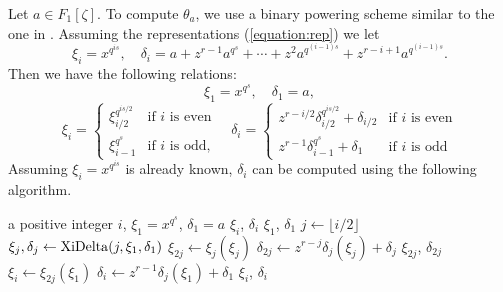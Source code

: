 \documentclass[12pt]{article}
\theoremstyle{plain}
\theoremstyle{definition}
\newcounter{algorithm}
\begin{document}
Let $a \in F_1[\zeta]$. To compute $\theta_a$, we use a binary powering scheme similar to the one 
in \cite{doliskanischost2011}. Assuming the representations (\ref{equation:rep}) we let 
\[
\xi_i = x^{q^{is}}, \quad
\delta_i = a + z^{r - 1}a^{q^s} + \cdots + z^2a^{q^{(i - 1)s}} + z^{r - i + 1} a^{q^{(i - 1)s}}.
\]
Then we have the following relations:
\[\xi_1 = x^{q^s}, \quad \delta_1 = a, \]
\[
\xi_i =
\begin{cases}
\xi_{i / 2}^{q^{is / 2}} & \text{if $i$ is even}  \\
\xi_{i - 1}^{q^s} & \text{if $i$ is odd,}
\end{cases} \quad
\delta_i=
\begin{cases}
z^{r - i / 2}\delta_{i / 2}^{q^{is / 2}} + \delta_{i / 2} & \text{if $i$ is even} \\
z^{r - 1}\delta_{i - 1}^{q^s} + \delta_1 & \text{if $i$ is odd}
\end{cases}
\]
Assuming $\xi_i = x^{q^{is}}$ is already known, $\delta_i$ can be computed using the following 
algorithm.

\begin{algorithm}
	\label{algorithm:xidelta}
	\begin{algorithmic}[1]
		\REQUIRE a positive integer $i$, $\xi_1 = x^{q^s}$, $\delta_1 = a$
		\ENSURE $\xi_i$, $\delta_i$
		\RETURN $\xi_1$, $\delta_1$
		\ENDIF
		\STATE $j \leftarrow \lfloor i/2\rfloor$
		\STATE $\xi_{j}, \delta_j \leftarrow {\rm XiDelta}(j,\xi_1,\delta_1)$ 
		\STATE\label{step:xi} $\xi_{2j} \leftarrow \xi_j(\xi_j)$
		\STATE\label{step:delta} $\delta_{2j} \leftarrow z^{r - j}\delta_j(\xi_j) + \delta_j$
		\RETURN $\xi_{2j}$, $\delta_{2j}$
		\ENDIF
		\STATE $\xi_i \leftarrow \xi_{2j}(\xi_1)$
		\STATE $\delta_i \leftarrow z^{r - 1}\delta_j(\xi_1) + \delta_1$
		\RETURN $\xi_i$, $\delta_i$
	\end{algorithmic}
\end{algorithm}
\end{document}
